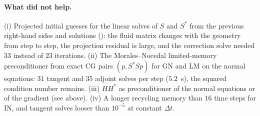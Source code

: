 \documentclass[11pt,a4paper]{article}
\theoremstyle{definition}
\theoremstyle{remark}
\begin{document}
\begin{table}[ht]\centering
\caption{All methods with the ingredients of \cref{sec:fast_ingredients}: per time step iterations,
state evaluations, tangent and adjoint solves and fluid Krylov iterations. Left: constant time
step, $100$ steps; right: start-up phase $t\in[0,1]$ with adaptive time step, $101$ steps. IQN-ILS:
partitioned iterations of the Dirichlet--Neumann solver of ExaDG.}
\label{tab:fast_methods}
\small
{}
\end{table}

\paragraph{What did not help.} (i) Projected initial guesses for the linear solves of $S$ and
$S^*$ from the previous right-hand sides and solutions (): the fluid
matrix changes with the geometry from step to step, the projection residual is large, and the
correction solve needed $33$ instead of $23$ iterations. (ii) The Morales--Nocedal limited-memory
preconditioner from exact CG pairs $(p,S^*Sp)$ for GN and LM on the normal equations: $31$ tangent
and $35$ adjoint solves per step ($5.2$~s), the squared condition number remains. (iii) $HH^*$ as
preconditioner of the normal equations or of the gradient (see above). (iv) A longer recycling
memory than $16$ time steps for IN, and tangent solves looser than $10^{-5}$ at constant $\Delta t$.
\end{document}
